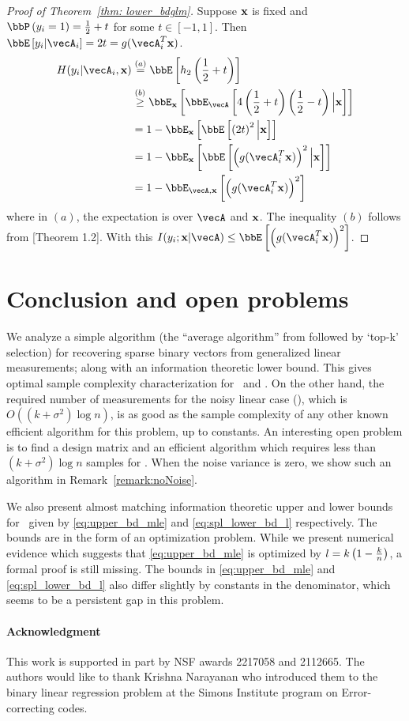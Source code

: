 \begin{proof}[Proof of Theorem~\ref{thm: lower_bdglm}]
Suppose $\mathbf{x}$ is fixed and $\bbP\inp{y_i = 1} = \frac{1}{2} + t$ for some $t\in [-1,1]$.  Then $\bbE\insq{y_i|\vecA_i} = 2t = g(\vecA_i^T\bx)$.
\begin{align*}
H(y_i|\vecA_i, \bx) &\stackrel{(a)}{=} \bbE\insq{h_2\inp{\frac{1}{2} + t}}\\
& \stackrel{(b)}{\geq} \bbE_{\bx}\insq{\bbE_{\vecA}\insq{4\inp{\frac{1}{2} + t}\inp{\frac{1}{2} - t}\Big|\bx}}\\
& = 1- \bbE_{\bx}\insq{\bbE\insq{\inp{2t}^2\Big|\bx}}\\
& = 1- \bbE_{\bx}\insq{\bbE\insq{\inp{g(\vecA_i^T\bx)}^2\Big|\bx}}\\
& = 1- \bbE_{\vecA, \bx}\insq{\inp{g(\vecA_i^T\bx)}^2}
\end{align*}
where in $(a)$, the expectation is over $\vecA$ and $\mathbf{x}$. The inequality $(b)$ follows from [Theorem 1.2]\cite{topsoe2001bounds}. With this $I(y_i;\bx|\vecA)\leq \bbE\insq{\inp{g(\vecA_i^T\bx)}^2}$.
\end{proof}










\section{Conclusion and open problems}\label{sec:conclusion}
We analyze a simple algorithm (the ``average algorithm'' from \cite{vershyninPlan}  followed by `top-k' selection) for recovering sparse binary vectors from generalized linear measurements; along with an information theoretic lower bound. This gives optimal sample complexity characterization for \bcs\ and \logreg. On the other hand, the required number of measurements for the noisy linear case (\spl), which is $O((k+\sigma^2)\log{n})$, is as good as the sample complexity of any other known efficient algorithm for this problem, up to constants.  An interesting open problem is to find a design matrix and an efficient algorithm which requires less than $(k+\sigma^2)\log{n}$ samples for \spl. When the noise variance is zero, we show such an algorithm in  Remark~\ref{remark:noNoise}. 


We also present almost matching information theoretic upper and lower bounds for \spl\ given by  \eqref{eq:upper_bd_mle} and \eqref{eq:spl_lower_bd_l} respectively. The bounds are in the form of an optimization problem. While we present numerical evidence which suggests that \eqref{eq:upper_bd_mle} is optimized by $l = k\left(1-\frac{k}{n}\right)$, a formal proof is still missing. The bounds in   \eqref{eq:upper_bd_mle} and \eqref{eq:spl_lower_bd_l} also differ slightly by constants in the denominator, which seems to be a persistent gap in this problem.


\paragraph{Acknowledgment}
This work is supported in part by NSF awards 2217058 and 2112665. The authors would like to thank Krishna Narayanan who introduced them to the binary linear regression problem at the Simons Institute program on Error-correcting codes.